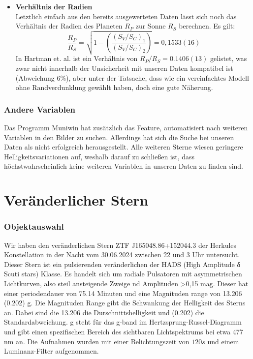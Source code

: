 \documentclass[ngerman,ruledheaders=section,class=report,thesis={type=Protokoll},accentcolor=1b,marginpar=false,parskip=half-,fontsize=11pt,]{tudapub}
\begin{document}
\begin{itemize}
		\item \textbf{Verhältnis der Radien} \\
		Letztlich einfach aus den bereits ausgewerteten Daten lässt sich noch das Verhältnis der Radien des Planeten $R_P$ zur Sonne $R_S$ berechnen. Es gilt:
		\begin{equation}
			\frac{R_P}{R_S} = \sqrt{1 - \left( \frac{(S_V / S_C)_1}{(S_V / S_C)_2}\right)} = 0,1533(16)
		\end{equation}
		In Hartman et. al. \cite{hartman2009hat} ist ein Verhältnis von $R_P / R_S = 0.1406(13)$ gelistet, was zwar nicht innerhalb der Unsicherheit mit unseren Daten kompatibel ist (Abweichung 6\%), aber unter der Tatsache, dass wie ein vereinfachtes Modell ohne Randverdunklung gewählt haben, doch eine gute Näherung.  
	\end{itemize}
	\subsection{Andere Variablen}
	Das Programm Muniwin hat zusätzlich das Feature, automatisiert nach weiteren Variablen in den Bilder zu suchen. Allerdings hat sich die Suche bei unseren Daten als nicht erfolgreich herausgestellt. Alle weiteren Sterne wiesen geringere Helligkeitsvariationen auf, weshalb darauf zu schließen ist, dass höchstwahrscheinlich keine weiteren Variablen in unseren Daten zu finden sind. 
	
	
	
	\chapter{Veränderlicher Stern} 
	
	\subsection{Objektauswahl} 
	Wir haben den veränderlichen Stern ZTF J165048.86+152044.3 der Herkules Konstellation in der Nacht vom 30.06.2024 zwischen 22 und 3 Uhr untersucht.
Dieser Stern ist ein pulsierenden veränderlichen der HADS (High Amplitude δ Scuti stars) Klasse. Es handelt sich um radiale Pulsatoren mit asymmetrischen Lichtkurven, also steil ansteigende Zweige nd Amplituden >0,15 mag.
Dieser hat einer periodendauer von 75.14 Minuten und eine Magnituden range von 13.206 (0.202) g. Die Magnituden Range gibt die Schwankung der Helligkeit des Sterns an. Dabei sind die 13.206 die Durschnittshelligkeit und (0.202) die Standardabweichung. g steht für das g-band im Hertzsprung-Russel-Diagramm und gibt einen spezifischen Bereich des sichtbaren Lichtspektrums bei etwa 477 nm an.
Die Aufnahmen wurden mit einer Belichtungszeit von $120\si{s}$ und einem Luminanz-Filter aufgenommen.
	
\end{document}
